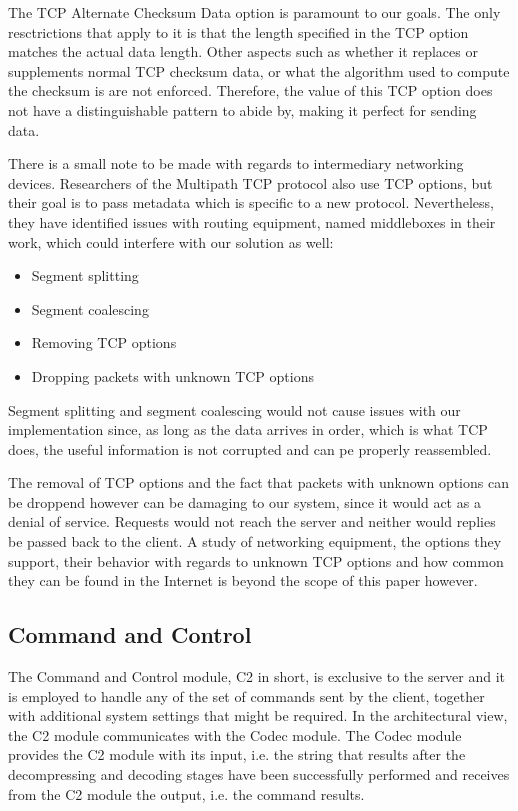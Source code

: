 The TCP Alternate Checksum Data option is paramount to our goals. The only
resctrictions that apply to it is that the length specified in the TCP option
matches the actual data length. Other aspects such as whether it replaces or
supplements normal TCP checksum data, or what the algorithm used to compute the
checksum is are not enforced. Therefore, the value of this TCP option does not
have a distinguishable pattern to abide by, making it perfect for sending data.

There is a small note to be made with regards to intermediary networking devices.
Researchers of the Multipath TCP protocol \cite{mptcp-how-hard} also use TCP options, but
their goal is to pass metadata which is specific to a new protocol. Nevertheless,
they have identified issues with routing equipment, named middleboxes in their work,
which could interfere with our solution as well:
\begin{itemize}
\item Segment splitting
\item Segment coalescing
\item Removing TCP options
\item Dropping packets with unknown TCP options
\end{itemize}

Segment splitting and segment coalescing would not cause issues with our implementation
since, as long as the data arrives in order, which is what TCP does, the useful
information is not corrupted and can pe properly reassembled.

The removal of TCP options and the fact that packets with unknown options can be
droppend however can be damaging to our system, since it would act as a denial of
service. Requests would not reach the server and neither would replies be passed
back to the client. A study of networking equipment, the options they support, their
behavior with regards to unknown TCP options and how common they can be found in
the Internet is beyond the scope of this paper however.

\subsection{Command and Control}

The Command and Control module, C2 in short, is exclusive to the server and it is
employed to handle any of the set of commands sent by the client, together with additional
system settings that might be required. In the architectural view, the C2 module
communicates with the Codec module. The Codec module provides the C2 module with
its input, i.e. the string that results after the decompressing and decoding stages
have been successfully performed and receives from the C2 module the output, i.e.
the command results.
	
